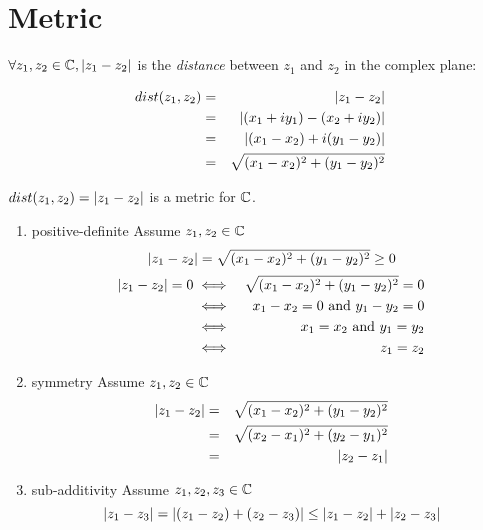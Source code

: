 \documentclass[letterpaper,12pt,fleqn]{article}
\begin{document}
\section*{Metric}
$\forall z_1,z_2\in\mathbb{C},\lvert z_1-z_2\rvert$ is the \emph{distance} between $z_1$ and
$z_2$ in the complex plane:
\begin{figure}[h]
\setlength{\leftskip}{0.5in}
\end{figure}
\begin{eqnarray*}
dist(z_1,z_2) &=& \lvert z_1-z_2\rvert \\
    &=& \lvert(x_1+iy_1)-(x_2+iy_2)\rvert \\
    &=& \lvert(x_1-x_2)+i(y_1-y_2)\rvert \\
    &=& \sqrt{(x_1-x_2)^2+(y_1-y_2)^2} \\
\end{eqnarray*}

\begin{theorem}
$dist(z_1,z_2)=\lvert z_1-z_2\rvert$ is a metric for $\mathbb{C}$.
\end{theorem}

\begin{theproof}
\listbreak
\begin{enumerate}
\item{positive-definite}
Assume $z_1,z_2\in\mathbb{C}$
\[\lvert z_1-z_2\rvert=\sqrt{(x_1-x_2)^2+(y_1-y_2)^2}\ge0\]
\begin{eqnarray*}
\lvert z_1-z_2\rvert=0 &\iff& \sqrt{(x_1-x_2)^2+(y_1-y_2)^2}=0 \\
    &\iff& x_1-x_2=0\ \mbox{and}\ y_1-y_2=0 \\
    &\iff& x_1=x_2\ \mbox{and}\ y_1=y_2 \\
    &\iff& z_1=z_2 \\
\end{eqnarray*}

\item{symmetry}
Assume $z_1,z_2\in\mathbb{C}$
\begin{eqnarray*}
\lvert z_1-z_2\rvert &=& \sqrt{(x_1-x_2)^2+(y_1-y_2)^2} \\
    &=& \sqrt{(x_2-x_1)^2+(y_2-y_1)^2} \\
    &=& \lvert z_2-z_1\rvert \\
\end{eqnarray*}

\item{sub-additivity}
Assume $z_1,z_2,z_3\in\mathbb{C}$
\[\lvert z_1-z_3\rvert=\lvert(z_1-z_2)+(z_2-z_3)\rvert\le\lvert z_1-z_2\rvert+\lvert z_2-z_3\rvert\]
\end{enumerate}
\end{theproof}
\end{document}
